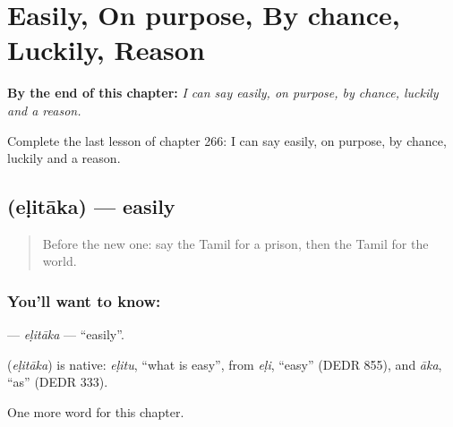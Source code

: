 
\chapter{Easily, On purpose, By chance, Luckily, Reason}
\label{ch:ta-easily-on-purpose-by-chance-luckily-reason}

\begin{chapteropening}
\textbf{By the end of this chapter:} \emph{I can say easily, on purpose, by chance, luckily and a reason.}

Complete the last lesson of chapter 266: I can say easily, on purpose, by chance, luckily and a reason.
\end{chapteropening}

\section[\texorpdfstring{\ta{எளிதாக} (eḷitāka)}{எளிதாக (eḷitāka)}]{ (eḷitāka) — easily}

\label{lesson:TA-C266-elitaka}



\begin{quote}
Before the new one: say the Tamil for a prison, then the Tamil for the world.
\end{quote}

\subsection*{You'll want to know: }
\textbf{} — \emph{eḷitāka} — \textquotedblleft{}easily\textquotedblright{}.

\begin{cousinweb}
\textbf{} (\emph{eḷitāka}) is native: \emph{eḷitu}, \textquotedblleft{}what is easy\textquotedblright{}, from \emph{eḷi}, \textquotedblleft{}easy\textquotedblright{} (DEDR 855), and \emph{āka}, \textquotedblleft{}as\textquotedblright{} (DEDR 333).
\end{cousinweb}

\begin{grammarlens}[title={What you've built}]
One more word for this chapter.
\end{grammarlens}

